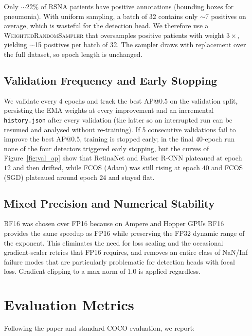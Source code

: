 \documentclass[11pt,a4paper]{article}
\begin{document}
Only $\sim$22\% of RSNA patients have positive annotations (bounding boxes for pneumonia). With uniform sampling, a batch of 32 contains only $\sim$7 positives on average, which is wasteful for the detection head. We therefore use a \textsc{WeightedRandomSampler} that oversamples positive patients with weight $3\times$, yielding $\sim$15 positives per batch of 32. The sampler draws with replacement over the full dataset, so epoch length is unchanged.

\pagebreak

\subsection{Validation Frequency and Early Stopping}

We validate every 4 epochs and track the best AP@0.5 on the validation split, persisting the EMA weights at every improvement and an incremental \texttt{history.json} after every validation (the latter so an interrupted run can be resumed and analysed without re-training). If 5 consecutive validations fail to improve the best AP@0.5, training is stopped early; in the final $40$-epoch run none of the four detectors triggered early stopping, but the curves of Figure~\ref{fig:val_ap} show that RetinaNet and Faster R-CNN plateaued at epoch $12$ and then drifted, while FCOS (Adam) was still rising at epoch $40$ and FCOS (SGD) plateaued around epoch $24$ and stayed flat.

\subsection{Mixed Precision and Numerical Stability}

BF16 was chosen over FP16 because on Ampere and Hopper GPUs BF16 provides the same speedup as FP16 while preserving the FP32 dynamic range of the exponent. This eliminates the need for loss scaling and the occasional gradient-scaler retries that FP16 requires, and removes an entire class of NaN/Inf failure modes that are particularly problematic for detection heads with focal loss. Gradient clipping to a max norm of $1.0$ is applied regardless.

\section{Evaluation Metrics}
\label{sec:metrics}

Following the paper and standard COCO evaluation, we report:
\end{document}

